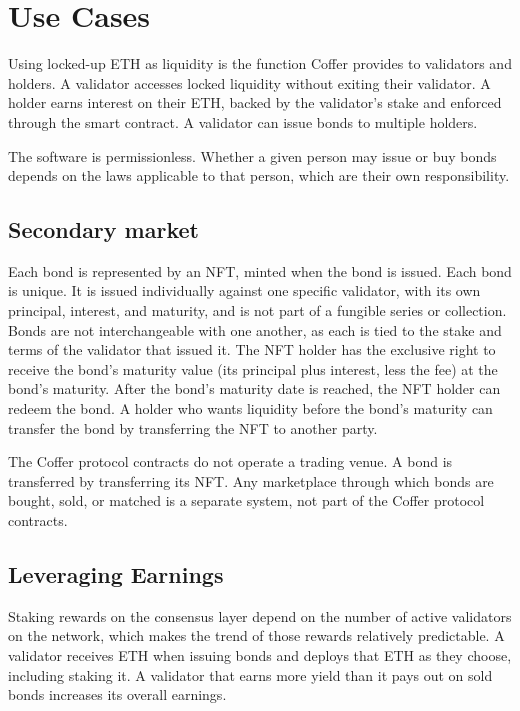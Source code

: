 \documentclass{article}
\begin{document}
\section{Use Cases}
Using locked-up ETH as liquidity is the function Coffer provides to validators and holders. A validator accesses locked liquidity without exiting their validator. A holder earns interest on their ETH, backed by the validator's stake and enforced through the smart contract. A validator can issue bonds to multiple holders.

The software is permissionless. Whether a given person may issue or buy bonds depends on the laws applicable to that person, which are their own responsibility.

\subsection{Secondary market}
Each bond is represented by an NFT, minted when the bond is issued. Each bond is unique. It is issued individually against one specific validator, with its own principal, interest, and maturity, and is not part of a fungible series or collection. Bonds are not interchangeable with one another, as each is tied to the stake and terms of the validator that issued it. The NFT holder has the exclusive right to receive the bond's maturity value (its principal plus interest, less the fee) at the bond's maturity. After the bond's maturity date is reached, the NFT holder can redeem the bond. A holder who wants liquidity before the bond's maturity can transfer the bond by transferring the NFT to another party.

The Coffer protocol contracts do not operate a trading venue. A bond is transferred by transferring its NFT. Any marketplace through which bonds are bought, sold, or matched is a separate system, not part of the Coffer protocol contracts.

\subsection{Leveraging Earnings}

Staking rewards on the consensus layer depend on the number of active validators on the network, which makes the trend of those rewards relatively predictable. A validator receives ETH when issuing bonds and deploys that ETH as they choose, including staking it. A validator that earns more yield than it pays out on sold bonds increases its overall earnings.
\end{document}
